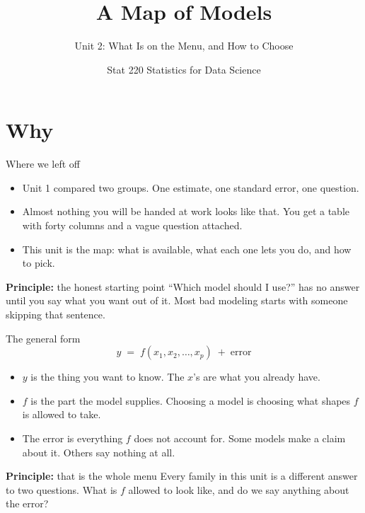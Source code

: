 \documentclass[aspectratio=169]{beamer}
\title{A Map of Models}
\subtitle{Unit 2: What Is on the Menu, and How to Choose}
\author{Stat 220 \textbar{} Statistics for Data Science}
\date{}
\newenvironment{principle}[1]{\begin{block}{\textbf{Principle:} #1}}{\end{block}}
\begin{document}
\begin{frame}
  \titlepage
\end{frame}

\section{Why}
\begin{frame}{Where we left off}
\begin{itemize}
  \item Unit 1 compared two groups. One estimate, one standard error, one question.
  \item Almost nothing you will be handed at work looks like that. You get a table with forty
        columns and a vague question attached.
  \item This unit is the map: what is available, what each one lets you do, and how to pick.
\end{itemize}
\begin{principle}{the honest starting point}
``Which model should I use?'' has no answer until you say what you want out of it. Most bad
modeling starts with someone skipping that sentence.
\end{principle}
\end{frame}

\begin{frame}{The general form}
\[
y \;=\; f(x_1, x_2, \ldots, x_p) \;+\; \text{error}
\]
\begin{itemize}
  \item $y$ is the thing you want to know. The $x$'s are what you already have.
  \item $f$ is the part the model supplies. Choosing a model is choosing what shapes $f$ is
        allowed to take.
  \item The error is everything $f$ does not account for. Some models make a claim about it.
        Others say nothing at all.
\end{itemize}
\begin{principle}{that is the whole menu}
Every family in this unit is a different answer to two questions. What is $f$ allowed to look
like, and do we say anything about the error?
\end{principle}
\end{frame}
\end{document}
